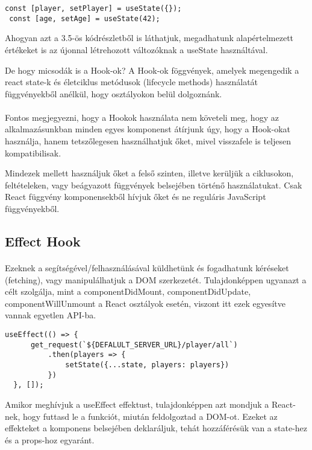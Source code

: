 \begin{lstlisting}[caption= useState hook-nak a használata]
 const [player, setPlayer] = useState({});
 const [age, setAge] = useState(42);
\end{lstlisting}

Ahogyan azt a 3.5-ös kódrészletből is láthatjuk, megadhatunk alapértelmezett értékeket is az újonnal létrehozott változóknak a useState használtával.

De hogy micsodák is a Hook-ok? A Hook-ok föggvények, amelyek megengedik a react state-k és életciklus metódusok (lifecycle methods) használatát függvényekből anélkül, hogy osztályokon belül dolgoznánk. 

\paragraph{}
Fontos megjegyezni, hogy a Hookok használata nem követeli meg, hogy az alkalmazásunkban minden egyes komponenst átírjunk úgy, hogy a Hook-okat  használja, hanem tetszőlegesen használhatjuk őket, mivel visszafele is teljesen kompatibilisak.

Mindezek mellett használjuk őket a felső szinten, illetve kerüljük a ciklusokon, feltételeken, vagy beágyazott függvények belsejében történő használatukat. Csak React függvény komponensekből hívjuk őket és ne reguláris JavaScript függvényekből.

\subsection{Effect Hook}
\paragraph{}
Ezeknek a segítségével/felhasználásával küldhetünk és fogadhatunk kéréseket (fetching), vagy manipulálhatjuk a DOM szerkezetét. Tulajdonképpen ugyanazt a célt szolgálja, mint a componentDidMount, componentDidUpdate, componentWillUnmount  a React osztályok esetén, viszont itt ezek egyesítve vannak egyetlen API-ba.

\begin{lstlisting}[caption= useEffect hook-nak a használata]
  useEffect(() => {
      get_request(`${DEFALULT_SERVER_URL}/player/all`)
          .then(players => {
              setState({...state, players: players})
          })
  }, []);
\end{lstlisting}
  
Amikor meghívjuk a useEffect effektust, tulajdonképpen azt mondjuk a React-nek, hogy futtasd le a funkciót, miután feldolgoztad a DOM-ot. Ezeket az effekteket a komponens belsejében deklaráljuk, tehát hozzáférésük van a state-hez és a props-hoz egyaránt. 
 
